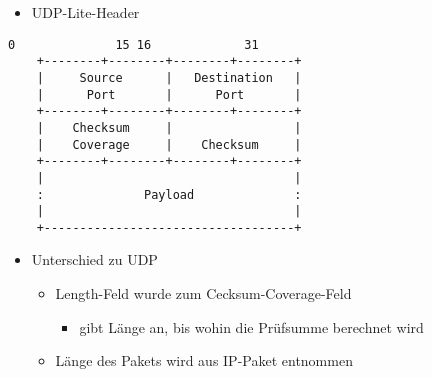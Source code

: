 \documentclass{beamer}
\begin{document}
\begin{frame}[fragile]
\begin{itemize}
\item UDP-Lite-Header
\end{itemize}
\begin{lstlisting}[linewidth=0.90\textwidth=small]
     0              15 16             31
    +--------+--------+--------+--------+
    |     Source      |   Destination   |
    |      Port       |      Port       |
    +--------+--------+--------+--------+
    |    Checksum     |                 |
    |    Coverage     |    Checksum     |
    +--------+--------+--------+--------+
    |                                   |
    :              Payload              :
    |                                   |
    +-----------------------------------+
\end{lstlisting}
\begin{itemize}
\item Unterschied zu UDP
	\begin{itemize}
	\item Length-Feld wurde zum Cecksum-Coverage-Feld
		\begin{itemize}
		\item gibt Länge an, bis wohin die Prüfsumme berechnet wird
		\end{itemize}
	\item Länge des Pakets wird aus IP-Paket entnommen
	\end{itemize}
\end{itemize}
\end{frame}

\end{document}
